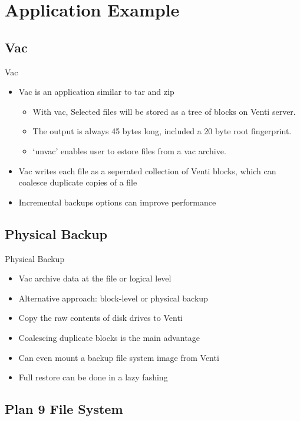 \section{Application Example}\label{application-example}

\subsection{Vac}

\begin{frame}{Vac}

\begin{itemize}
\itemsep1pt\parskip0pt
\item
  Vac is an application similar to tar and zip

  \begin{itemize}
  \itemsep1pt\parskip0pt
  \item
    With vac, Selected files will be stored as \newline{} a tree of
    blocks on Venti server.
  \item
    The output is always 45 bytes long,\newline{} included a 20 byte
    root fingerprint.
  \item
    `unvac' enables user to estore files from a vac archive.
  \end{itemize}
\item
  Vac writes each file as a seperated collection of Venti blocks, which
  can coalesce duplicate copies of a file
\item
  Incremental backups options can improve performance
\end{itemize}

\subsection[Phy Bak]{Physical Backup}

\end{frame}

\begin{frame}{Physical Backup}

\begin{itemize}
\itemsep1pt\parskip0pt
\item
  Vac archive data at the file or logical level
\item
  Alternative approach: block-level or physical backup
\item
  Copy the raw contents of disk drives to Venti
\item
  Coalescing duplicate blocks is the main advantage
\item
  Can even mount a backup file system image from Venti
\item
  Full restore can be done in a lazy fashing
\end{itemize}

\subsection[Plan 9]{Plan 9 File System}

\end{frame}

